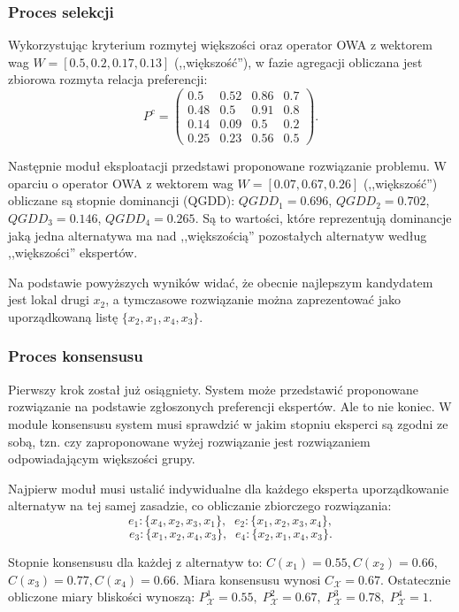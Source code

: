 \subsubsection{Proces selekcji}
Wykorzystując kryterium rozmytej większości oraz operator OWA z wektorem wag
$W= [0.5,0.2,0.17,0.13]$ (,,większość''), w fazie agregacji obliczana jest
zbiorowa rozmyta relacja preferencji:
$$
P^c = 
\begin{pmatrix}
0.5  & 0.52  & 0.86   & 0.7  \\
0.48 & 0.5   & 0.91   & 0.8  \\
0.14 & 0.09  & 0.5    & 0.2  \\
0.25 & 0.23  & 0.56   & 0.5
\end{pmatrix}.
$$

Następnie moduł eksploatacji przedstawi proponowane rozwiązanie problemu. 
W oparciu o operator OWA z wektorem wag $W = [0.07, 0.67, 0.26]$
(,,większość'') obliczane są stopnie dominancji (QGDD): $QGDD_1 = 0.696$,
$QGDD_2 = 0.702$, $QGDD_3 = 0.146$, $QGDD_4 = 0.265$. Są to wartości, które
reprezentują dominancje jaką jedna alternatywa ma nad ,,większością''
pozostałych alternatyw według ,,większości'' ekspertów.

Na podstawie powyższych wyników widać, że obecnie najlepszym kandydatem jest
lokal drugi $x_2$, a tymczasowe rozwiązanie można zaprezentować jako
uporządkowaną listę $\{ x_2, x_1,x_4, x_3\}$.

\subsubsection{Proces konsensusu}
Pierwszy krok został już osiągniety. System może przedstawić proponowane
rozwiązanie na podstawie zgłoszonych preferencji ekspertów. Ale to nie koniec. W
module konsensusu system musi sprawdzić w jakim stopniu eksperci są zgodni ze
sobą, tzn. czy zaproponowane wyżej rozwiązanie jest rozwiązaniem odpowiadającym
większości grupy.

Najpierw moduł musi ustalić indywidualne dla każdego eksperta uporządkowanie
alternatyw na tej samej zasadzie, co obliczanie zbiorczego rozwiązania:
$$e_1: \{ x_4, x_2, x_3, x_1 \}, \;\; e_2: \{ x_1, x_2, x_3, x_4 \},$$
$$e_3: \{ x_1, x_2, x_4, x_3 \}, \;\; e_4: \{ x_2, x_1, x_4, x_3 \}.$$

Stopnie konsensusu dla każdej z alternatyw to: $C(x_1) = 0.55, C(x_2) =
0.66,$ $C(x_3) = 0.77, C(x_4) = 0.66.$ Miara konsensusu wynosi
$C_{\mathcal{X}} = 0.67$.
Ostatecznie obliczone miary bliskości wynoszą: $P^1_{\mathcal{X}} = 0.55,\;
P^2_{\mathcal{X}} = 0.67,\; P^3_{\mathcal{X}} = 0.78,\; P^4_{\mathcal{X}} = 1$.

